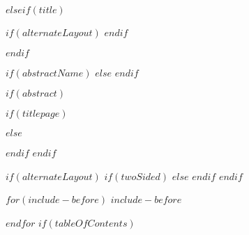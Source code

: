 \documentclass[$if(fontSize)$$fontSize$,%
	$if(language)$$language$,$else$english,$endif$%
	$if(paperSize)$$paperSize$,$else$ a4paper,%
	$endif$$if(classOptions)$$classOptions$,$endif$%
	$if(twoSided)$twoside,$endif$%
	$if(titlepage)$titlepage,$endif$%
	$if(centerEqs)$$else$fleqn$endif$]{$if(documentClass)$%
		$documentClass$$else$article$endif$}
\begin{document}
\restoregeometry

$elseif(title)$
    	\maketitle
        $if(alternateLayout)$
            \thispagestyle{fancy}
        $endif$

$endif$


$if(abstractName)$
    \renewcommand\abstractname{\sffamily $abstractName$}
$else$
    \renewcommand\abstractname{\sffamily Abstract}
$endif$

$if(abstract)$




$if(titlepage)$
    \restoregeometry
    \thispagestyle{plain}
	\begin{abstract}
		$abstract$
	\end{abstract}
$else$
\setlength{\absparindent}{0.51em}


	\begin{abstract}
	\begin{abstractBox} %
		$abstract$
	\end{abstractBox}
	\end{abstract}


$endif$
$endif$

$if(alternateLayout)$
    \fancyhf{}
    $if(twoSided)$
    $else$
        \SetBgContents{\color{black}\rule{.4pt}{\textheight + 2\headsep + 0.25pt - 0.5\footskip}}
        \SetBgVshift{\headsep}
    $endif$
    \renewcommand{\headrulewidth}{0.0pt}
    \renewcommand{\footrulewidth}{0.4pt}
    \renewcommand{\footrule}{{\rule{\textwidth + 0.5\marginparsep}{\footrulewidth}}}
    \fancyfoot[R]{\sffamily{\thepage}}
$endif$
 

$for(include-before)$
$include-before$

$endfor$
$if(tableOfContents)$
{
\hypersetup{linkcolor=black}
\setcounter{tocdepth}{$toc-depth$}
\tableofcontents
}
\end{document}
